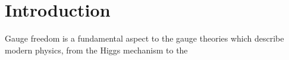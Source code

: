 \section{Introduction}
\label{sec:introduction}

Gauge freedom is a fundamental aspect to the gauge theories which describe
modern physics, from the Higgs mechanism\cite{higgs-1964} to the 
